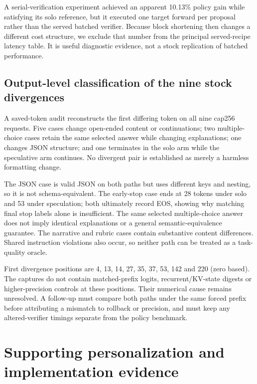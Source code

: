 \documentclass[
  11pt,
]{article}
\begin{document}
A serial-verification experiment achieved an apparent 10.13\% policy
gain while satisfying its solo reference, but it executed one target
forward per proposal rather than the served batched verifier. Because
block shortening then changes a different cost structure, we exclude
that number from the principal served-recipe latency table. It is useful
diagnostic evidence, not a stock replication of batched performance.

\subsection{Output-level classification of the nine stock
divergences}\label{output-level-classification-of-the-nine-stock-divergences}

A saved-token audit reconstructs the first differing token on all nine
cap256 requests. Five cases change open-ended content or continuations;
two multiple-choice cases retain the same selected answer while changing
explanations; one changes JSON structure; and one terminates in the solo
arm while the speculative arm continues. No divergent pair is
established as merely a harmless formatting change.

The JSON case is valid JSON on both paths but uses different keys and
nesting, so it is not schema-equivalent. The early-stop case ends at 28
tokens under solo and 53 under speculation; both ultimately record EOS,
showing why matching final stop labels alone is insufficient. The same
selected multiple-choice answer does not imply identical explanations or
a general semantic-equivalence guarantee. The narrative and rubric cases
contain substantive content differences. Shared instruction violations
also occur, so neither path can be treated as a task-quality oracle.

First divergence positions are 4, 13, 14, 27, 35, 37, 53, 142 and 220
(zero based). The captures do not contain matched-prefix logits,
recurrent/KV-state digests or higher-precision controls at these
positions. Their numerical cause remains unresolved. A follow-up must
compare both paths under the same forced prefix before attributing a
mismatch to rollback or precision, and must keep any altered-verifier
timings separate from the policy benchmark.

\section{Supporting personalization and implementation
evidence}\label{supporting-personalization-and-implementation-evidence}
\end{document}
